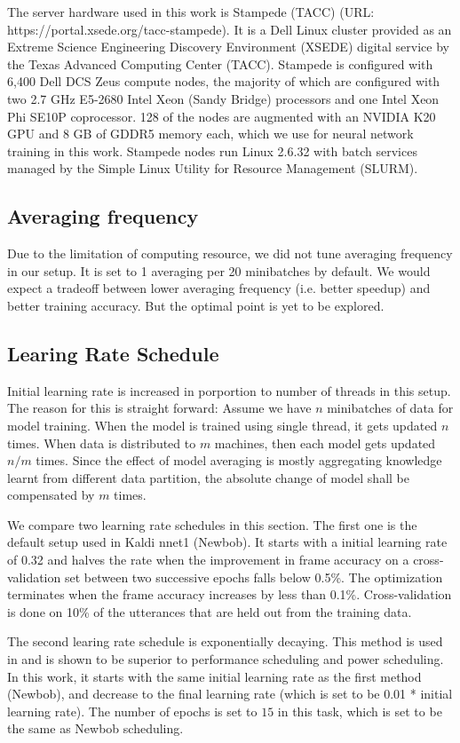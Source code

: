 \documentclass{article}
\begin{document}
The server hardware used in this work is Stampede (TACC) (URL: https://portal.xsede.org/tacc-stampede). It is a Dell Linux 
cluster provided as an Extreme Science Engineering Discovery Environment (XSEDE) digital service by the Texas Advanced 
Computing Center (TACC). Stampede is configured with 6,400 Dell DCS Zeus compute nodes, the majority of which are configured
with two 2.7 GHz E5-2680 Intel Xeon (Sandy Bridge) processors and one Intel Xeon Phi SE10P coprocessor. 128 of the nodes are 
augmented with an NVIDIA K20 GPU and 8 GB of GDDR5 memory each, which we use for neural network training in this work.
Stampede nodes run Linux 2.6.32 with batch services managed by the Simple Linux Utility for Resource Management (SLURM).

\subsection{Averaging frequency}
Due to the limitation of computing resource, we did not tune averaging frequency in our setup. It is set to 1 averaging
per 20 minibatches by default. We would expect a tradeoff between lower averaging frequency (i.e. better speedup) and
better training accuracy. But the optimal point is yet to be explored.

\subsection{Learing Rate Schedule}
Initial learning rate is increased in porportion to number of threads in this setup. The reason for this is straight forward:
Assume we have $n$ minibatches of data for model training. When the model is trained using single thread, it gets updated $n$
times. When data is distributed to $m$ machines, then each model gets updated $n/m$ times. Since the effect of model averaging 
is mostly aggregating knowledge learnt from different data partition, the absolute change of model shall be compensated by 
$m$ times.

We compare two learning rate schedules in this section. The first one is the default setup used in Kaldi nnet1 (Newbob). 
It starts with a initial learning rate of 0.32 and halves the rate when the improvement in frame accuracy on a cross-validation 
set between two successive epochs falls below 0.5\%. The optimization terminates when the frame accuracy increases by less 
than 0.1\%. Cross-validation is done on 10\% of the utterances that are held out from the training data.

The second learing rate schedule is exponentially decaying. This method is used in \cite{senior2013empirical,povey2014parallel} 
and is shown to be superior to performance scheduling and power scheduling. In this work, it starts with the same initial learning
rate as the first method (Newbob), and decrease to the final learning rate (which is set to be 0.01 * initial learning rate). The
number of epochs is set to $15$ in this task, which is set to be the same as Newbob scheduling.
\end{document}
